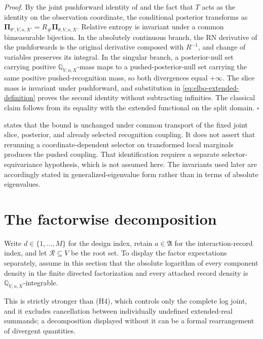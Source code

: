 \emph{Proof.} By the joint pushforward identity of
 and the fact that \(T\) acts as the identity on the
observation coordinate, the conditional posterior transforms as
\(\boldsymbol\Pi_{\theta',V,o,X'}
=R_{\#}\boldsymbol\Pi_{\theta,V,o,X}\).
Relative entropy is invariant under a common bimeasurable bijection. In the absolutely continuous branch, the RN derivative of the pushforwards is the original derivative composed with \(R^{-1}\), and change of variables preserves its integral. In the singular branch, a posterior-null set carrying positive \(\mathbb Q_{V,o,X}\)-mass maps to a pushed-posterior-null set carrying the same positive pushed-recognition mass, so both divergences equal \(+\infty\). The slice mass is invariant under pushforward, and substitution in \eqref{eq:elbo-extended-definition} proves the second identity without subtracting infinities. The classical claim follows from its equality with the extended functional on the split domain. \hfill\(\square\)

 states that the bound is unchanged under common transport of the fixed joint slice, posterior, and already selected recognition coupling. It does not assert that rerunning a coordinate-dependent selector on transformed local marginals produces the pushed coupling. That identification requires a separate selector-equivariance hypothesis, which is not assumed here. The invariants used later are accordingly stated in generalized-eigenvalue form rather than in terms of absolute eigenvalues.

\section{The factorwise decomposition}
\label{sec:elbo-factorization}

Write \(d\in\{1,\ldots,M\}\) for the design index, retain \(a\in\mathfrak A\) for the interaction-record index, and let \(\mathcal R\subseteq V\) be the root set. To display the factor expectations separately, assume in this section that the absolute logarithm of every component density in the finite directed factorization and every attached record density is \(\mathbb Q_{V,o,X}\)-integrable. 

This is strictly stronger than (H4), which controls only the complete log
joint, and it excludes cancellation between individually undefined
extended-real summands; a decomposition displayed without it can be a formal
rearrangement of divergent quantities. 

